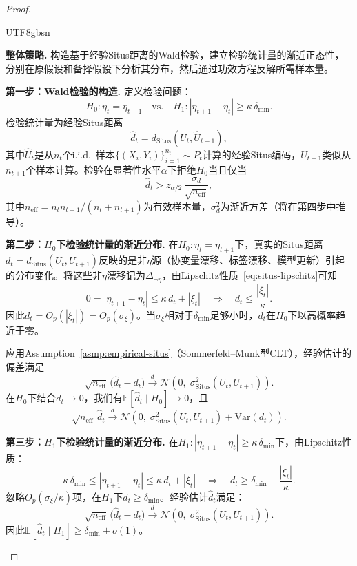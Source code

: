 \documentclass[12pt,a4paper]{article}
\newcommand{\E}{\mathbb{E}}
\newcommand{\Situs}{\mathrm{Situs}}
\begin{document}
\begin{proof}
\label{pf:drift-detect}
\begin{CJK}{UTF8}{gbsn}

\textbf{整体策略.} 构造基于经验Situs距离的Wald检验，建立检验统计量的渐近正态性，分别在原假设和备择假设下分析其分布，然后通过功效方程反解所需样本量。

\medskip\noindent
\textbf{第一步：Wald检验的构造.}
定义检验问题：
\[
H_0: \eta_t = \eta_{t+1} \quad\text{vs.}\quad
H_1: |\eta_{t+1} - \eta_t| \ge \kappa\,\delta_{\min}.
\]
检验统计量为经验Situs距离
\[
\widehat{d}_t = d_{\Situs}(\widehat{U}_t, \widehat{U}_{t+1}),
\]
其中$\widehat{U}_t$是从$n_t$个i.i.d.\ 样本$\{(X_i,Y_i)\}_{i=1}^{n_t}\sim P_t$计算的经验Situs编码，$\widehat{U}_{t+1}$类似从$n_{t+1}$个样本计算。检验在显著性水平$\alpha$下拒绝$H_0$当且仅当
\[
\widehat{d}_t > z_{\alpha/2}\,\frac{\sigma_d}{\sqrt{n_{\text{eff}}}},
\]
其中$n_{\text{eff}} = n_t n_{t+1}/(n_t + n_{t+1})$为有效样本量，$\sigma_d^2$为渐近方差（将在第四步中推导）。

\medskip\noindent
\textbf{第二步：$H_0$下检验统计量的渐近分布.}
在$H_0: \eta_t = \eta_{t+1}$下，真实的Situs距离$d_t = d_{\Situs}(U_t, U_{t+1})$反映的是非$\eta$源（协变量漂移、标签漂移、模型更新）引起的分布变化。将这些非$\eta$漂移记为$\Delta_{\neg\eta}$，由Lipschitz性质~\eqref{eq:situs-lipschitz}可知
\[
0 = |\eta_{t+1}-\eta_t| \le \kappa\,d_t + |\xi_t|
\quad\Longrightarrow\quad
d_t \le \frac{|\xi_t|}{\kappa}.
\]
因此$d_t = O_p(|\xi_t|) = O_p(\sigma_\xi)$。当$\sigma_\xi$相对于$\delta_{\min}$足够小时，$d_t$在$H_0$下以高概率趋近于零。

应用Assumption~\ref{asmp:empirical-situs}（Sommerfeld--Munk型CLT），经验估计的偏差满足
\[
\sqrt{n_{\text{eff}}}\,
\bigl(\widehat{d}_t - d_t\bigr)
\xrightarrow{d} \mathcal{N}(0,\; \sigma_{\Situs}^2(U_t, U_{t+1})).
\]
在$H_0$下结合$d_t \to 0$，我们有$\E[\widehat{d}_t \mid H_0] \to 0$，且
\[
\sqrt{n_{\text{eff}}}\,\widehat{d}_t \xrightarrow{d}
\mathcal{N}(0,\; \sigma_{\Situs}^2(U_t, U_{t+1}) + \text{Var}(d_t)).
\]

\medskip\noindent
\textbf{第三步：$H_1$下检验统计量的渐近分布.}
在$H_1: |\eta_{t+1} - \eta_t| \ge \kappa\,\delta_{\min}$下，由Lipschitz性质：
\[
\kappa\,\delta_{\min} \le |\eta_{t+1} - \eta_t|
\le \kappa\,d_t + |\xi_t|
\quad\Longrightarrow\quad
d_t \ge \delta_{\min} - \frac{|\xi_t|}{\kappa}.
\]
忽略$O_p(\sigma_\xi/\kappa)$项，在$H_1$下$d_t \ge \delta_{\min}$。经验估计$\widehat{d}_t$满足：
\[
\sqrt{n_{\text{eff}}}\,
\bigl(\widehat{d}_t - d_t\bigr)
\xrightarrow{d} \mathcal{N}(0,\; \sigma_{\Situs}^2(U_t, U_{t+1})).
\]
因此$\E[\widehat{d}_t \mid H_1] \ge \delta_{\min} + o(1)$。


\end{CJK}
\end{proof}
\end{document}
